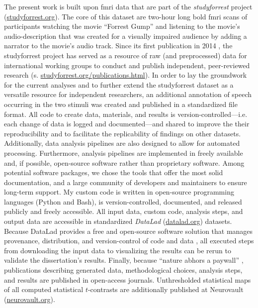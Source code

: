 %
The present work is built upon \ac{fmri} data that are part of the
\textit{studyforrest} project
(\href{www.studyforrest.org}{\url{studyforrest.org}}).
The core of this dataset are two-hour long \ac{bold} \ac{fmri} scans of
participants watching the movie ``Forrest Gump'' \citep{ForrestGumpMovie} and
listening to the movie's audio-description that was created for a visually
impaired audience by adding a narrator to the movie's audio track.
Since its first publication in 2014 \citep{hanke2014audiomovie}, the
studyforrest project has served as a resource of raw (and preprocessed) data for
international working groups to conduct and publish independent, peer-reviewed
research (s.
\href{www.studyforrest.org/publications.html}{\url{studyforrest.org/publications.html}}).
%
In order to lay the groundwork for the current analyses and to further extend
the studyforrest dataset as a versatile resource for independent researchers, an
additional annotation of speech occurring in the two stimuli was created and
published \citep{haeusler2021speechanno} in a standardized file format.
%
All code to create data, materials, and results is version-controlled---i.e.
each change of data is logged and documented---and shared to improve the their
reproducibility and to facilitate the replicability of findings on other
datasets.
Additionally, data analysis pipelines are also designed to allow for automated
processing.
Furthermore, analysis pipelines are implemented in freely available and, if
possible, open-source software rather than proprietary software.
Among potential software packages, we chose the tools that offer the most solid
documentation, and a large community of developers and maintainers to ensure
long-term support.
My custom code is written in open-source programming languages (Python and
Bash), is version-controlled, documented, and released publicly and freely
accessible.
All input data, custom code, analysis steps, and output data are accessible in
standardized \textit{DataLad} (\href{www.datalad.org}{datalad.org}) datasets.
%
Because DataLad provides a free and open-source software solution that manages
provenance, distribution, and version-control of code and data
\citep{halchenko2021datalad}, all executed steps from downloading the input data
to visualizing the results can be rerun to validate the dissertation's results.
Finally, because ``nature abhors a paywall'' \citep{dupre2020nature},
publications describing generated data, methodological choices, analysis steps,
and results are published in open-access journals.
Unthresholded statistical maps of all computed statistical $t$-contrasts are
additionally published at Neurovault
(\href{https://neurovault.org/}{neurovault.org}).



